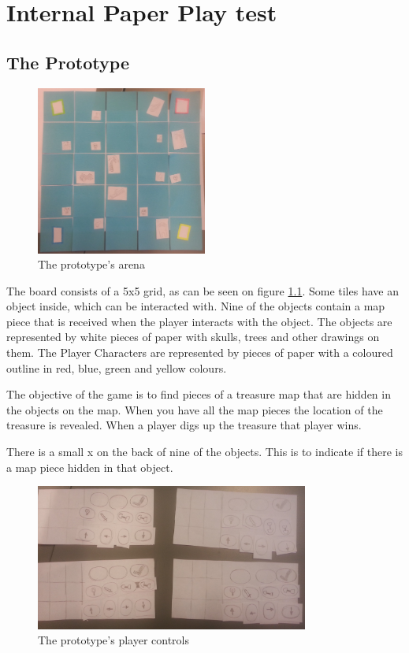 \chapter{Internal Paper Play test}\label{ch:paperPlaytest}
\section{The Prototype}
\begin{figure}[h] 
\centering 
\includegraphics[width=0.5\textwidth]{figures/PPtestArena}
\caption{The prototype's arena} \label{fig:PPtest1}
\end{figure}
The board consists of a 5x5 grid, as can be seen on figure \ref{fig:PPtest1}. Some tiles have an object inside, which can be interacted with. Nine of the objects contain a map piece that is received when the player interacts with the object. The objects are represented by white pieces of paper with skulls, trees and other drawings on them. The Player Characters are represented by pieces of paper with a coloured outline in red, blue, green and yellow colours.

The objective of the game is to find pieces of a treasure map that are hidden in the objects on the map. When you have all the map pieces the location of the treasure is revealed. When a player digs up the treasure that player wins.


There is a small x on the back of nine of the objects. This is to indicate if there is a map piece hidden in that object.

\begin{figure}[h]
\centering
\includegraphics[width=0.8\textwidth]{figures/PPtestControls}  
\caption{The prototype's player controls}\label{fig:PPtest2}
\end{figure}

